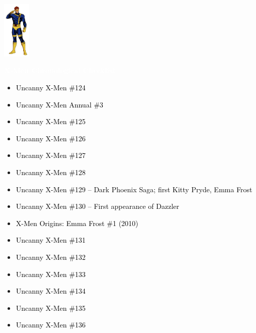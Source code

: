 \documentclass[12pt]{article}
\newcommand{\checkbox}{\raisebox{0.0ex}{\fbox{\rule{0ex}{1.5ex} \rule{1.5ex}{0ex}}}}
\begin{document}
\begin{center}
    \vspace*{2cm}
    \includegraphics[width=0.1\textwidth]{cyclops.png}
    \vspace{0.3cm}

    {\Huge \textbf{\textcolor{white}{X-Men Chronological Checklist}}}
\end{center}

\vspace{0.3cm}
\noindent
\begin{tcolorbox}[
  colback=white!95!gray,
  colframe=black,
  width=\textwidth,
  arc=4mm,
  auto outer arc,
  boxrule=0.8pt,
  left=8pt,right=8pt,top=8pt,bottom=8pt
]
\begin{itemize}[left=0pt,label={\checkbox}]
  \item \textcolor{black}{Uncanny X-Men \#124}
  \item \textcolor{black}{Uncanny X-Men Annual \#3}
  \item \textcolor{black}{Uncanny X-Men \#125}
  \item \textcolor{black}{Uncanny X-Men \#126}
  \item \textcolor{black}{Uncanny X-Men \#127}
  \item \textcolor{black}{Uncanny X-Men \#128}
  \item \textcolor{black}{Uncanny X-Men \#129 – Dark Phoenix Saga; first Kitty Pryde, Emma Frost}
  \item \textcolor{black}{Uncanny X-Men \#130 – First appearance of Dazzler}
  \item \textcolor{black}{X-Men Origins: Emma Frost \#1 (2010)}
  \item \textcolor{black}{Uncanny X-Men \#131}
  \item \textcolor{black}{Uncanny X-Men \#132}
  \item \textcolor{black}{Uncanny X-Men \#133}
  \item \textcolor{black}{Uncanny X-Men \#134}
  \item \textcolor{black}{Uncanny X-Men \#135}
  \item \textcolor{black}{Uncanny X-Men \#136}
\end{itemize}
\end{tcolorbox}
\end{document}
